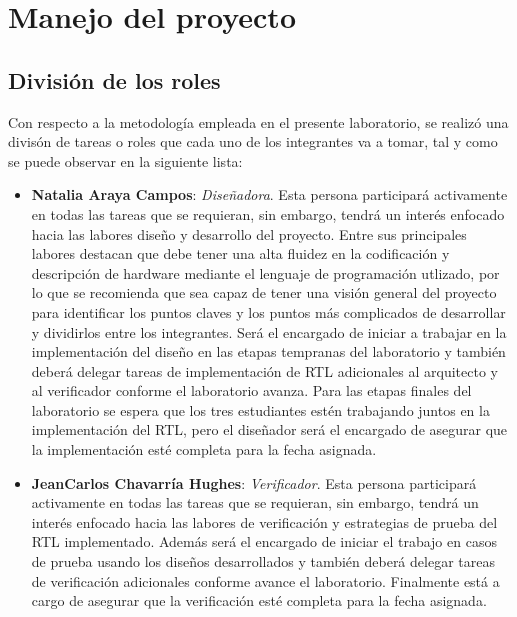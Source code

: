 \newpage
\section{Manejo del proyecto}

\subsection{Divisi\' on de los roles}
Con respecto a la metodolog\' ia empleada en el presente laboratorio, se realiz\' o una divis\' on de tareas o roles que cada uno de los integrantes va a tomar, tal y como se puede observar en la siguiente lista:\\

\begin{itemize}
\item \textbf{Natalia Araya Campos}: \textit{Dise\~nadora}. Esta persona participar\' a activamente en todas las tareas que se requieran, sin embargo, tendr\'a un inter\'es enfocado hacia las labores dise\~ no y desarrollo del proyecto. Entre sus principales labores destacan que debe tener una alta fluidez en la codificaci\' on y descripci\' on de hardware mediante el lenguaje de programaci\' on utlizado, por lo que se recomienda que sea capaz de tener una visi\' on general del proyecto para identificar los puntos claves y los puntos m\' as complicados de desarrollar y dividirlos entre los integrantes. Ser\'a el encargado de iniciar a trabajar en la implementaci\'on del diseño en las etapas tempranas del laboratorio y tambi\'en deber\'a delegar tareas de implementaci\'on de RTL adicionales al arquitecto y al verificador conforme el laboratorio avanza. Para las etapas finales del laboratorio se espera que los tres estudiantes est\'en trabajando juntos en la implementaci\'on del RTL, pero el dise\~nador ser\'a el encargado de asegurar que la implementaci\'on est\'e completa para la fecha asignada. 
\item \textbf{JeanCarlos Chavarr\'ia Hughes}: \textit{Verificador}. Esta persona participar\' a activamente en todas las tareas que se requieran, sin embargo, tendr\' a un inter\' es enfocado hacia las labores de verificaci\' on y estrategias de prueba del RTL implementado. Adem\' as ser\'a el encargado de iniciar el trabajo en casos de prueba usando los dise\~nos desarrollados y tambi\'en deber\'a delegar tareas de verificaci\'on adicionales conforme avance el laboratorio. Finalmente est\'a a cargo de asegurar que la verificaci\'on est\'e completa para la fecha asignada.

\end{itemize}
